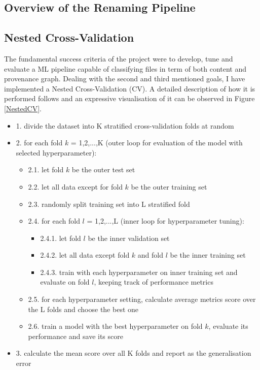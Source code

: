 \subsection{Overview of the Renaming Pipeline}

\subsection{Nested Cross-Validation}

The fundamental success criteria of the project were to develop, tune and evaluate a ML pipeline capable of classifying files in term of both content and provenance graph. Dealing with the second and third mentioned goals, I have implemented a Nested Cross-Validation (CV). A detailed description of how it is performed follows and an expressive visualisation of it can be observed in Figure \ref{NestedCV}. \bigskip

\begin{itemize}[label={}]
  \item 1. divide the dataset into K stratified cross-validation folds at random
  \item 2. for each fold $k$ = 1,2,...,K (outer loop for evaluation of the model with selected hyperparameter):
        \begin{itemize}[label={}]
          \item 2.1. let fold $k$ be the outer test set
          \item 2.2. let all data except for fold $k$ be the outer training set
          \item 2.3. randomly split training set into L stratified fold
          \item 2.4. for each fold $l$ = 1,2,...,L (inner loop for hyperparameter tuning):
                \begin{itemize}[label={}]
                  \item 2.4.1. let fold $l$ be the inner validation set
                  \item 2.4.2. let all data except fold $k$ and fold $l$ be the inner training set
                  \item 2.4.3. train with each hyperparameter on inner training set and evaluate on fold $l$, keeping track of performance metrics
                \end{itemize}
          \item 2.5. for each hyperparameter setting, calculate average metrics score over the L folds and choose the best one
          \item 2.6. train a model with the best hyperparameter on fold $k$, evaluate its performance and save its score
        \end{itemize}
  \item 3. calculate the mean score over all K folds and report as the generalisation error
\end{itemize} \bigskip


